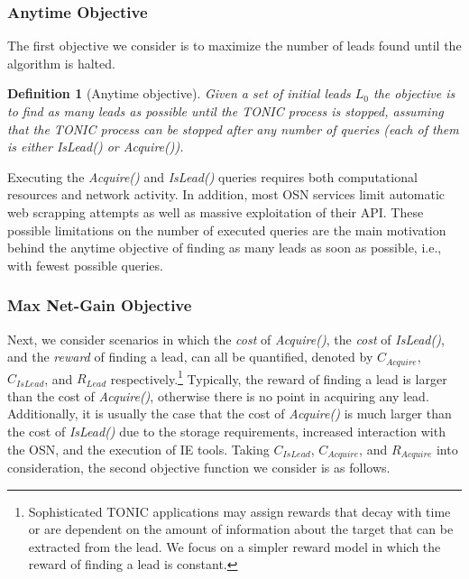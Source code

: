 \documentclass[journal]{IEEEtran}
\newcommand{\islead}[1]{{\em IsLead(#1)}}
\newcommand{\acquire}[1]{{\em Acquire(#1)}}
\newtheorem{definition}{Definition}
\begin{document}


\subsubsection{Anytime Objective}

The first objective we consider is to maximize the number of leads found until the algorithm is halted. 


\begin{definition}[Anytime objective]
Given a set of initial leads \(L_0\) the objective is to find as many leads as possible until the TONIC process is stopped, assuming that the TONIC process can be stopped after any number of queries (each of them is either \islead{} or \acquire{}).
\label{def:budget}
\end{definition}

Executing the \acquire{} and \islead{} queries requires both computational resources and network activity. 
In addition, most OSN services limit automatic web scrapping attempts as well as massive exploitation of their API. 
These possible limitations on the number of executed queries are the main motivation behind the anytime objective of finding as many leads as soon as possible, i.e., with fewest possible queries.  

\subsubsection{Max Net-Gain Objective}
Next, we consider 
scenarios in which the {\em cost} of \acquire{}, the {\em cost} of \islead{}, and the {\em reward} of finding a lead, can all be quantified, denoted by $C_{Acquire}$, $C_{IsLead}$, and $R_{Lead}$ respectively.\footnote{Sophisticated TONIC applications may assign rewards that decay with time or are dependent on the amount of information about the target that can be extracted from the lead. We focus on a simpler reward model in which the reward of finding a lead is constant.} 
Typically, the reward of finding a lead is larger than the cost of \acquire{}, otherwise there is no point in acquiring any lead. Additionally, it is usually the case that the cost of \acquire{} is much larger than the cost of \islead{} due to the storage requirements, increased interaction with the OSN, and the execution of IE tools. Taking $C_{IsLead}$, $C_{Acquire}$, and $R_{Acquire}$ into consideration, the second objective function we consider is as follows.
\end{document}
